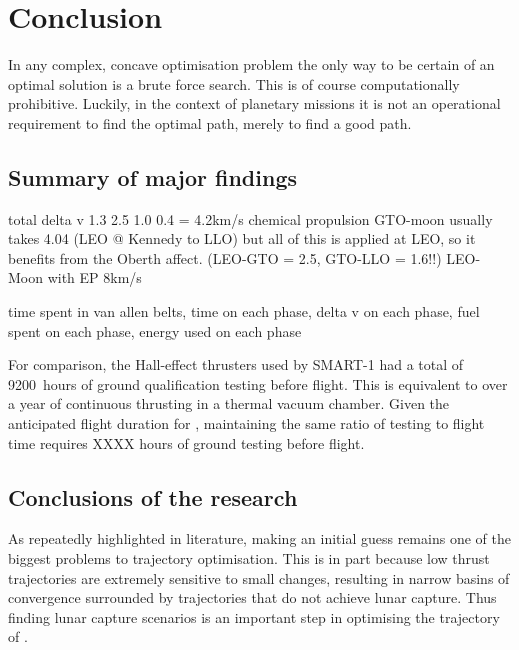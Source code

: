 \chapter{Conclusion} \label{cha:Conclusion}

In any complex, concave optimisation problem the only way to be certain of an optimal solution is a brute force search. This is of course computationally prohibitive. Luckily, in the context of planetary missions it is not an operational requirement to find the optimal path, merely to find a good path. 

\section{Summary of major findings}

total delta v 
1.3 2.5 1.0 0.4 = 4.2km/s
chemical propulsion GTO-moon usually takes 4.04 (LEO @ Kennedy to LLO) but all of this is applied at LEO, so it benefits from the Oberth affect. (LEO-GTO = 2.5, GTO-LLO = 1.6!!)
LEO-Moon with EP 8km/s

time spent in van allen belts, time on each phase, delta v on each phase, fuel spent on each phase, energy used on each phase



For comparison, the Hall-effect thrusters used by SMART-1 had a total of 9200~hours of ground qualification testing before flight. This is equivalent to over a year of continuous thrusting in a thermal vacuum chamber. Given the anticipated flight duration for \BW, maintaining the same ratio of testing to flight time requires XXXX hours of ground testing before flight.



\section{Conclusions of the research}

As repeatedly highlighted in literature, making an initial guess remains one of the biggest problems to trajectory optimisation. This is in part because low thrust trajectories are extremely sensitive to small changes, resulting in narrow basins of convergence surrounded by trajectories that do not achieve lunar capture. Thus finding lunar capture scenarios is an important step in optimising the trajectory of \BW.

